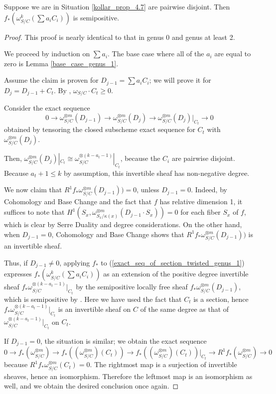 \begin{lemma}\label{inductive_step_genus_1}
Suppose we are in Situation \ref{kollar_prop_4.7} are pairwise disjoint.
Then $f_{*}(\omega_{S/C}^{k}(\sum a_iC_i))$ is semipositive.
\end{lemma}
\begin{proof}
This proof is nearly identical to that in genus 0 and genus at least 2.

We proceed by induction on $\sum a_i$. 
The base case where all of the $a_i$ are equal to zero is Lemma \ref{base_case_genus_1}.

Assume the claim is proven for $D_{j-1}=\sum a_iC_i$; we will prove it for $D_{j}=D_{j-1}+C_t$.
By , $\omega_{S/C}\cdot C_t\ge0$.

Consider the exact sequence
\begin{equation}\label{exact_seq_of_section_twisted_genus_1}
0\to\omega_{S/C}^{\otimes m}(D_{j-1})\to\omega_{S/C}^{\otimes m}(D_j)\to \omega_{S/C}^{\otimes m}(D_j)|_{C_t}\to0
\end{equation}
obtained by tensoring the closed subscheme exact sequence for $C_t$ with $\omega_{S/C}^{\otimes m}(D_j)$.

Then, $\omega_{S/C}^{\otimes m}(D_j)|_{C_t}\cong \omega_{S/C}^{\otimes (k-a_{t}-1)}|_{C_t}$, because the $C_i$ are pairwise disjoint.
Because $a_{t}+1\le k$ by assumption, this invertible sheaf has non-negative degree.

We now claim that $R^{1}f_{*}\omega_{S/C}^{\otimes m}(D_{j-1}))=0$, unless $D_{j-1}=0$.
Indeed, by Cohomology and Base Change and the fact that $f$ has relative dimension 1, it suffices to note that $H^{1}(S_x,\omega_{S_x/\kappa(x)}^{\otimes m}(D_{j-1}\cdot S_x))=0$ for each fiber $S_x$ of $f$, which is clear by Serre Duality and degree considerations.
On the other hand, when $D_{j-1}=0$, Cohomology and Base Change shows that $R^{1}f_{*}\omega_{S/C}^{\otimes m}(D_{j-1}))$ is an invertible sheaf.


Thus, if $D_{j-1}\neq0$, applying $f_{*}$ to (\ref{exact_seq_of_section_twisted_genus_1}) expresses $f_{*}(\omega_{S/C}^{k}(\sum a_iC_i))$ as an extension of the positive degree invertible sheaf $f_{*}\omega_{S/C}^{\otimes (k-a_{t}-1)}|_{C_t}$ by the semipositive locally free sheaf $f_{*}\omega_{S/C}^{\otimes m}(D_{j-1})$, which is semipositive by .
Here we have used the fact that $C_t$ is a section, hence $f_{*}\omega_{S/C}^{\otimes (k-a_{t}-1)}|_{C_t}$ is an invertible sheaf on $C$ of the same degree as that of $\omega_{S/C}^{\otimes (k-a_{t}-1)}|_{C_t}$ on $C_t$.

If $D_{j-1}=0$, the situation is similar; we obtain the exact sequence
$$
0\to f_{*}(\omega_{S/C}^{\otimes m})\to f_{*}((\omega_{S/C}^{\otimes m})(C_t))\to f_{*}((\omega_{S/C}^{\otimes m})(C_t))|_{C_t}\to R^{1}f_{*}(\omega_{S/C}^{\otimes m})\to0
$$
because $R^{1}f_{*}\omega_{S/C}^{\otimes m}(C_t)=0$. 
The rightmost map is a surjection of invertible sheaves, hence an isomorphism.
Therefore the leftmost map is an isomorphism as well, and we obtain the desired conclusion once again.
\end{proof}



